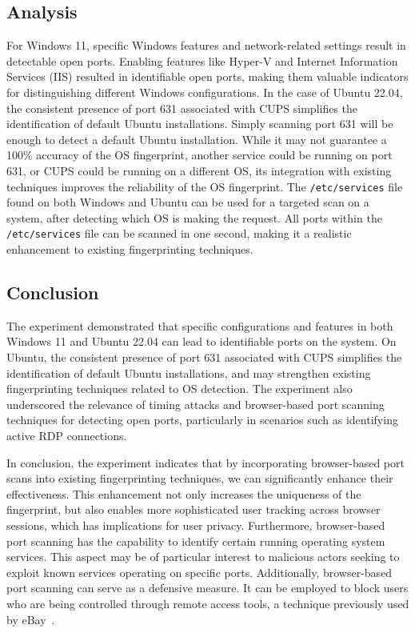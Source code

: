 \subsection{Analysis}

For Windows 11, specific Windows features and network-related settings result in detectable open ports. Enabling features like Hyper-V and Internet Information Services (IIS) resulted in identifiable open ports, making them valuable indicators for distinguishing different Windows configurations. 
In the case of Ubuntu 22.04, the consistent presence of port 631 associated with CUPS simplifies the identification of default Ubuntu installations. 
Simply scanning port 631 will be enough to detect a default Ubuntu installation. While it may not guarantee a 100\% accuracy of the OS fingerprint, another service could be running on port 631, or CUPS could be running on a different OS, its integration with existing techniques improves the reliability of the OS fingerprint. 
The \texttt{/etc/services} file found on both Windows and Ubuntu can be used for a targeted scan on a system, after detecting which OS is making the request. All ports within the \texttt{/etc/services} file can be scanned in one second, making it a realistic enhancement to existing fingerprinting techniques.  

\subsection{Conclusion}

The experiment demonstrated that specific configurations and features in both Windows 11 and Ubuntu 22.04 can lead to identifiable ports on the system.
On Ubuntu, the consistent presence of port 631 associated with CUPS simplifies the identification of default Ubuntu installations, and may strengthen existing fingerprinting techniques related to OS detection.
The experiment also underscored the relevance of timing attacks and browser-based port scanning techniques for detecting open ports, particularly in scenarios such as identifying active RDP connections.

In conclusion, the experiment indicates that by incorporating browser-based port scans into existing fingerprinting techniques, we can significantly enhance their effectiveness. This enhancement not only increases the uniqueness of the fingerprint, but also enables more sophisticated user tracking across browser sessions, which has implications for user privacy.
Furthermore, browser-based port scanning has the capability to identify certain running operating system services. This aspect may be of particular interest to malicious actors seeking to exploit known services operating on specific ports.
Additionally, browser-based port scanning can serve as a defensive measure. It can be employed to block users who are being controlled through remote access tools, a technique previously used by eBay~\cite{ebay_port_scans}.



